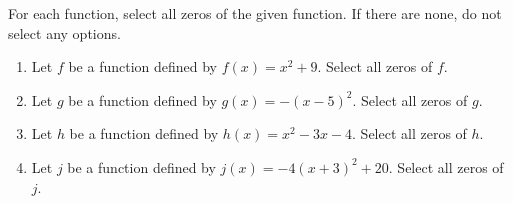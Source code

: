 \documentclass{ximera}
\author{Kenneth Berglund}
\begin{document}
\licenseSZ
\begin{exercise}
For each function, select all zeros of the given function. If there are none, do not select any options.

\begin{enumerate}
\item Let $f$ be a function defined by $f(x) = x^2 + 9$.
Select all zeros of $f$.
\begin{selectAll}
\end{selectAll}

\item Let $g$ be a function defined by $g(x) = -(x - 5)^2$.
Select all zeros of $g$.
\begin{selectAll}
\end{selectAll}

\item Let $h$ be a function defined by $h(x) = x^2 - 3x - 4$.
Select all zeros of $h$.
\begin{selectAll}
\end{selectAll}

\item Let $j$ be a function defined by $j(x) = -4(x + 3)^2 + 20$.
Select all zeros of $j$.
\begin{selectAll}
\end{selectAll}

\end{enumerate}

\end{exercise}
\end{document}
